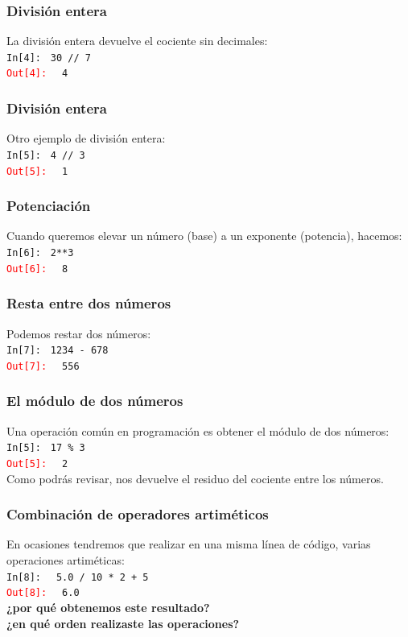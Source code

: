\documentclass[12pt]{beamer}
\begin{document}
\begin{frame}[fragile]
\frametitle{División entera}
La división entera devuelve el cociente sin decimales:
\\
\bigskip
\textcolor{ao}{\texttt{In[4]: }} \verb|30 // 7| \\
\pause
\textcolor{red}{\texttt{Out[4]: }} \verb| 4|
\end{frame}
\begin{frame}[fragile]
\frametitle{División entera}
Otro ejemplo de división entera:
\\
\bigskip
\textcolor{ao}{\texttt{In[5]: }} \verb|4 // 3| \\
\pause
\textcolor{red}{\texttt{Out[5]: }} \verb| 1|
\end{frame}
\begin{frame}[fragile]
\frametitle{Potenciación}
Cuando queremos elevar un número (base) a un exponente (potencia), hacemos:
\\
\bigskip
\textcolor{ao}{\texttt{In[6]: }} \verb|2**3| \\
\pause
\textcolor{red}{\texttt{Out[6]: }} \verb| 8|
\end{frame}
\begin{frame}[fragile]
\frametitle{Resta entre dos números}
Podemos restar dos números:
\\
\bigskip
\textcolor{ao}{\texttt{In[7]: }} \verb|1234 - 678| \\
\pause
\textcolor{red}{\texttt{Out[7]: }} \verb| 556|
\end{frame}
\begin{frame}[fragile]
\frametitle{El módulo de dos números}
Una operación común en programación es obtener el módulo de dos números:
\\
\bigskip
\textcolor{ao}{\texttt{In[5]: }} \verb|17 % 3| \\
\pause
\textcolor{red}{\texttt{Out[5]: }} \verb| 2|
\\
\bigskip
\pause
Como podrás revisar, nos devuelve el residuo del cociente entre los números.
\end{frame}
\begin{frame}[fragile]
\frametitle{Combinación de operadores artiméticos}
En ocasiones tendremos que realizar en una misma línea de código, varias operaciones artiméticas:
\\
\bigskip
\textcolor{ao}{\texttt{In[8]: }} \verb| 5.0 / 10 * 2 + 5| \\
\pause
\textcolor{red}{\texttt{Out[8]: }} \verb| 6.0|
\pause
\\
\bigskip
\textbf{¿por qué obtenemos este resultado?}
\\
\bigskip
\pause
\textbf{¿en qué orden realizaste las operaciones?}
\end{frame}
\end{document}
